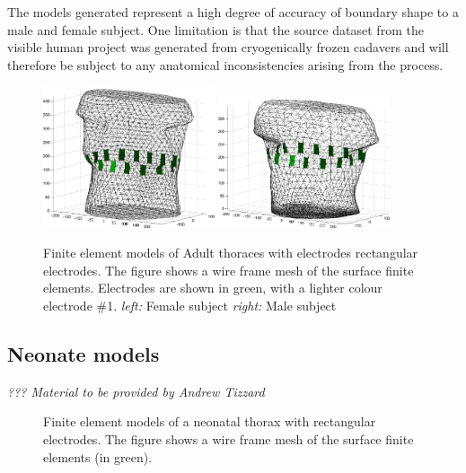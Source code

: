 \documentclass[12pt]{iopart}
\begin{document}
The models generated represent a high degree of accuracy of boundary
shape to a male and female subject.  One limitation is that the
source dataset from the visible
human project was generated from cryogenically frozen cadavers and
will therefore be subject to any anatomical inconsistencies arising from
the process.


\begin{figure}[bhtp]
\begin{center}
  \includegraphics[width= 0.45\textwidth]
         {figures/female_t_mdl.png}
  \includegraphics[width= 0.45\textwidth]
         {figures/male_t_mdl.png}
\caption{ \label{fig:AdultFEM}
Finite element models of Adult thoraces with electrodes
rectangular electrodes. The figure shows a wire frame mesh
of the surface finite elements. Electrodes are shown in green,
with a lighter colour electrode \#1.
{\em left:} Female subject
{\em right:} Male subject
}
\end{center}
\end{figure}


\subsection{Neonate models}

{\em ??? Material to be provided by Andrew Tizzard}

\begin{figure}[bhtp]
\begin{center}
\caption{ \label{fig:NeonateFEM}
Finite element models of a neonatal thorax with
rectangular electrodes. The figure shows a wire frame mesh
of the surface finite elements (in green).
}
\end{center}
\end{figure}
\end{document}
